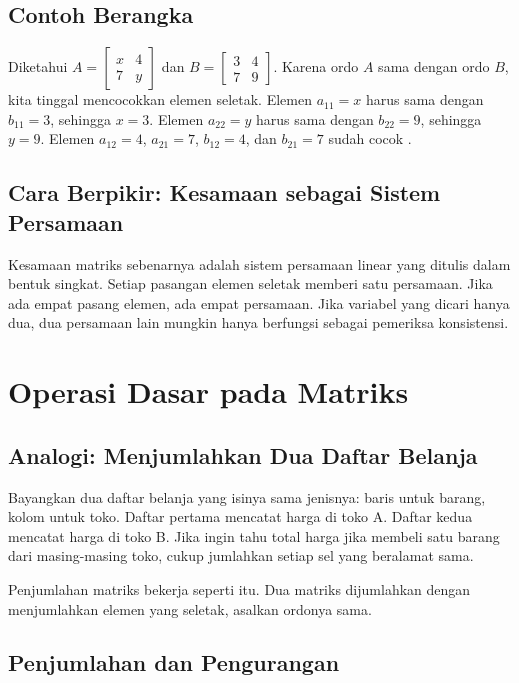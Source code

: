 \documentclass[11pt,a4paper]{article}
\begin{document}
\subsection{Contoh Berangka}

Diketahui $A=\begin{bmatrix}x&4\\7&y\end{bmatrix}$ dan $B=\begin{bmatrix}3&4\\7&9\end{bmatrix}$. Karena ordo $A$ sama dengan ordo $B$, kita tinggal mencocokkan elemen seletak. Elemen $a_{11}=x$ harus sama dengan $b_{11}=3$, sehingga $x=3$. Elemen $a_{22}=y$ harus sama dengan $b_{22}=9$, sehingga $y=9$. Elemen $a_{12}=4$, $a_{21}=7$, $b_{12}=4$, dan $b_{21}=7$ sudah cocok \cite{anton}.

\subsection{Cara Berpikir: Kesamaan sebagai Sistem Persamaan}

Kesamaan matriks sebenarnya adalah sistem persamaan linear yang ditulis dalam bentuk singkat. Setiap pasangan elemen seletak memberi satu persamaan. Jika ada empat pasang elemen, ada empat persamaan. Jika variabel yang dicari hanya dua, dua persamaan lain mungkin hanya berfungsi sebagai pemeriksa konsistensi.

\section{Operasi Dasar pada Matriks}

\subsection{Analogi: Menjumlahkan Dua Daftar Belanja}

Bayangkan dua daftar belanja yang isinya sama jenisnya: baris untuk barang, kolom untuk toko. Daftar pertama mencatat harga di toko A. Daftar kedua mencatat harga di toko B. Jika ingin tahu total harga jika membeli satu barang dari masing-masing toko, cukup jumlahkan setiap sel yang beralamat sama.

Penjumlahan matriks bekerja seperti itu. Dua matriks dijumlahkan dengan menjumlahkan elemen yang seletak, asalkan ordonya sama.

\subsection{Penjumlahan dan Pengurangan}
\end{document}
